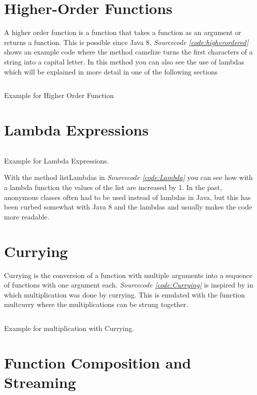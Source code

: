 \documentclass[a4paper,12pt,twoside]{scrreprt}
\begin{document}
\section{Higher-Order Functions}
A higher order function is a function that takes a function as an argument or returns a function. This is possible since Java 8. \emph{Sourcecode \ref{code:higherordered}} shows an example code where the method camelize turns the first characters of a string into a capital letter. In this method you can also see the use of lambdas which will be explained in more detail in one of the following sections
\begin{listing}[ht]
    \inputminted[fontsize=\footnotesize,linenos]{java}{./code/HigherOrderFunctions.java}
    \caption[Example for Higher Order Function]{Example for Higher Order Function}
    \label{code:higherordered}
\end{listing}
\section{Lambda Expressions}
\begin{listing}[ht]
    \inputminted[fontsize=\footnotesize,linenos]{java}{./code/Lambda.java}
    \caption[Example for Lambda]{Example for Lambda Expressions.}
    \label{code:Lambda}
\end{listing}
With the method listLambdas in \emph{Sourcecode \ref{code:Lambda}} you can see how with a lambda function the values of the list are increased by 1. In the past, anonymous classes often had to be used instead of lambdas in Java, but this has been curbed somewhat with Java 8 and the lambdas and usually makes the code more readable.
\section{Currying}
Currying is the conversion of a function with multiple arguments into a sequence of functions with one argument each. \emph{Sourcecode \ref{code:Currying}} is inspired by \cite{Robertson_currying_2018} in which multiplication was done by currying. This is emulated with the function multcurry where the multiplications can be strung together.
\begin{listing}[ht]
    \inputminted[fontsize=\footnotesize,linenos]{java}{./code/Currying.java}
    \caption[Example for Currying]{Example for multiplication with Currying.}
    \label{code:Currying}
\end{listing}
\section{Function Composition and Streaming}
\end{document}
